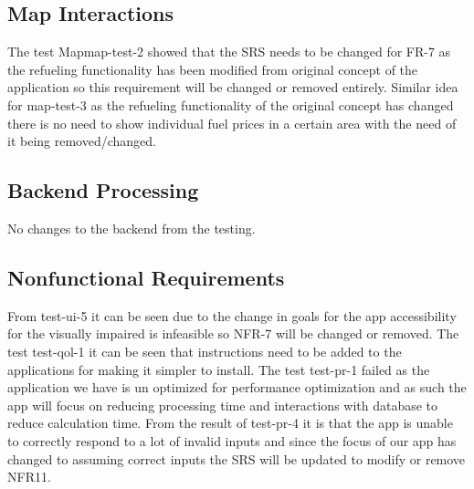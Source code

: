 \documentclass[12pt, titlepage]{article}
\begin{document}
\subsection{Map Interactions}
The test Mapmap-test-2 showed that the SRS needs to be changed for FR-7 as the refueling functionality has been modified from 
original concept of the application so this requirement will be changed or removed entirely. Similar idea for map-test-3 as the 
refueling functionality of the original concept has changed there is no need to show individual fuel prices in a certain area 
with the need of it being removed/changed.

\subsection{Backend Processing}
No changes to the backend from the testing.

\subsection{Nonfunctional Requirements}
From test-ui-5 it can be seen due to the change in goals for the app accessibility for the visually impaired is infeasible so NFR-7 will 
be changed or removed. The test test-qol-1 it can be seen that instructions need to be added to the applications for making it simpler to 
install. The test test-pr-1 failed as the application we have is un optimized for performance optimization and as such the app will focus 
on reducing processing time and interactions with database to reduce calculation time. From the result of test-pr-4 it is that the app is 
unable to correctly respond to a lot of invalid inputs and since the focus of our app has changed to assuming correct inputs the SRS will 
be updated to modify or remove NFR11.

\newpage
		
\end{document}
